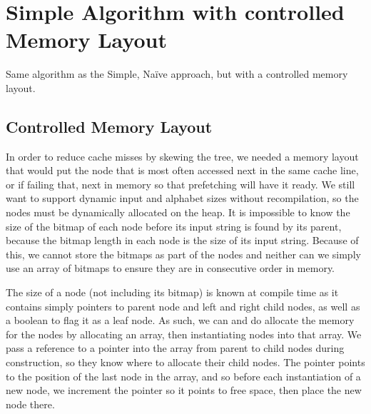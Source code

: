 \section{Simple Algorithm with controlled Memory Layout}
Same algorithm as the Simple, Naïve approach, but with a controlled memory layout.

\subsection{Controlled Memory Layout}
In order to reduce cache misses by skewing the tree, we needed a memory layout that would put the node that is most often accessed next in the same cache line, or if failing that, next in memory so that prefetching will have it ready.
We still want to support dynamic input and alphabet sizes without recompilation, so the nodes must be dynamically allocated on the heap.
It is impossible to know the size of the bitmap of each node before its input string is found by its parent, because the bitmap length in each node is the size of its input string.
Because of this, we cannot store the bitmaps as part of the nodes and neither can we simply use an array of bitmaps to ensure they are in consecutive order in memory.

The size of a node (not including its bitmap) is known at compile time as it contains simply pointers to parent node and left and right child nodes, as well as a boolean to flag it as a leaf node.
As such, we can and do allocate the memory for the nodes by allocating an array, then instantiating nodes into that array.
We pass a reference to a pointer into the array from parent to child nodes during construction, so they know where to allocate their child nodes.
The pointer points to the position of the last node in the array, and so before each instantiation of a new node, we increment the pointer so it points to free space, then place the new node there.

